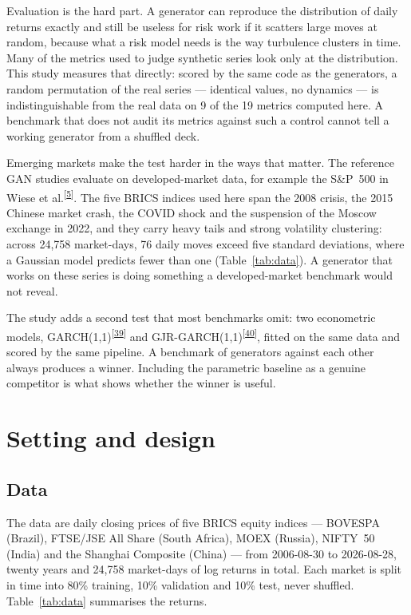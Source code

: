 \documentclass[11pt,a4paper]{article}
\makeatletter
\newcommand{\tcite}[1]{\textsuperscript{[\hyperlink{R:#1}{#1}]}}
\DeclareRobustCommand{\_}{\ifmmode\nfss@text{\textunderscore}\else\textunderscore\allowbreak\fi}
\makeatother
\begin{document}
Evaluation is the hard part. A generator can reproduce the distribution of daily returns exactly and still be useless for risk work if it scatters large moves at random, because what a risk model needs is the way turbulence clusters in time. Many of the metrics used to judge synthetic series look only at the distribution. This study measures that directly: scored by the same code as the generators, a random permutation of the real series --- identical values, no dynamics --- is indistinguishable from the real data on 9 of the 19 metrics computed here. A benchmark that does not audit its metrics against such a control cannot tell a working generator from a shuffled deck.

Emerging markets make the test harder in the ways that matter. The reference GAN studies evaluate on developed-market data, for example the S\&P~500 in Wiese et al.\tcite{5}. The five BRICS indices used here span the 2008 crisis, the 2015 Chinese market crash, the COVID shock and the suspension of the Moscow exchange in 2022, and they carry heavy tails and strong volatility clustering: across 24,758 market-days, 76 daily moves exceed five standard deviations, where a Gaussian model predicts fewer than one (Table~\ref{tab:data}). A generator that works on these series is doing something a developed-market benchmark would not reveal.

The study adds a second test that most benchmarks omit: two econometric models, GARCH(1,1)\tcite{39} and GJR-GARCH(1,1)\tcite{40}, fitted on the same data and scored by the same pipeline. A benchmark of generators against each other always produces a winner. Including the parametric baseline as a genuine competitor is what shows whether the winner is useful.
\section{Setting and design}
\label{sec:design}

\subsection{Data}
\label{sec:data}
The data are daily closing prices of five BRICS equity indices --- BOVESPA (Brazil), FTSE/JSE All Share (South Africa), MOEX (Russia), NIFTY~50 (India) and the Shanghai Composite (China) --- from 2006-08-30 to 2026-08-28, twenty years and 24,758 market-days of log returns in total. Each market is split in time into 80\% training, 10\% validation and 10\% test, never shuffled. Table~\ref{tab:data} summarises the returns.
\end{document}
